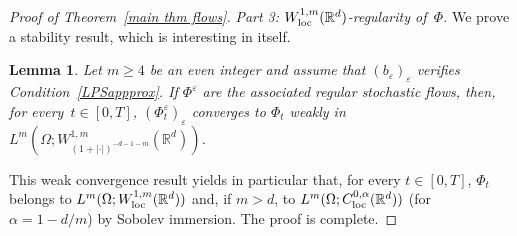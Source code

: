 \documentclass[a4paper,10pt]{article}
\newtheorem{lemma}[theorem]{Lemma}
\newcommand\1{\mathbbm{1}}
\newcommand{\mr}{\mathbb{R}}
\newcommand{\eps}{\varepsilon}
\newcommand\loc{{\rm loc}}
\numberwithin{equation}{section}
\begin{document}
\begin{proof}[Proof of Theorem~\ref{main thm flows}]
\emph{Part 3: $W^{1,m}_{\loc}(\mr^d)$-regularity of~$\Phi$.} We prove a stability result, which is interesting in itself.

\begin{lemma}\label{stability}
Let $m \geq 4$ be an even integer and assume that $(b_\eps)_\eps$ verifies Condition~\ref{LPSappprox}. If $\Phi^\eps$ are the associated regular stochastic flows, then, for every~$t \in [0,T]$, $(\Phi^\eps_t)_\eps$ converges to $\Phi_t$ weakly in $L^m(\Omega;W^{1,m}_{(1+|\cdot|)^{-d-1-m}}(\mr^d))$.
\end{lemma}

This weak convergence result yields in particular that, for every $t \in [0,T]$, $\Phi_t$ belongs to $L^m(\Omega;W^{1,m}_{\loc}(\mr^d))$ and, if $m>d$, to $L^m(\Omega;C^{0,\alpha}_{\loc}(\mr^d))$ (for $\alpha=1-d/m$) by Sobolev immersion. The proof is complete.
\end{proof}
\end{document}
